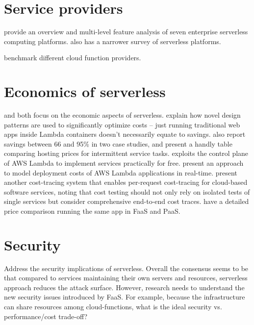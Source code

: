 \documentclass[utf8,english]{gradu3}
\begin{document}
\section{Service providers}

\textcite{lynn2017preliminary} provide an overview and multi-level feature analysis of seven enterprise serverless computing platforms. \textcite{baldini17currentTrends} also has a narrower survey of serverless platforms.

\textcite{malawski18benchmark} benchmark different cloud function providers.

\section{Economics of serverless}

\textcite{eivy2017wary} and \textcite{villamizar2016infrastructure} both focus on the economic aspects of serverless. \textcite{adzic2017serverless} explain how novel design patterns are used to significantly optimize costs -- just running traditional web apps inside Lambda containers doesn't necessarily equate to savings. \textcite{adzic2017serverless} also report savings between 66 and 95\% in two case studies, and present a handly table comparing hosting prices for intermittent service tasks. \textcite{spillner17exploiting} exploits the control plane of AWS Lambda to implement services practically for free. \textcite{leitner16modelcost} present an approach to model deployment costs of AWS Lambda applications in real-time. \textcite{kuhlenkamp17costradamus} present another cost-tracing system that enables per-request cost-tracing for cloud-based software services, noting that cost testing should not only rely on isolated tests of single services but consider comprehensive end-to-end cost traces. \textcite{albuquerque17faaspaas} have a detailed price comparison running the same app in FaaS and PaaS.

\section{Security}

Address the security implications of serverless. Overall the consensus seems to be that compared to services maintaining their own servers and resources, serverless approach reduces the attack surface. However, research needs to understand the new security issues introduced by FaaS. For example, because the infrastructure can share resources among cloud-functions, what is the ideal security vs. performance/cost trade-off? \parencite{van2017spec}
\end{document}

